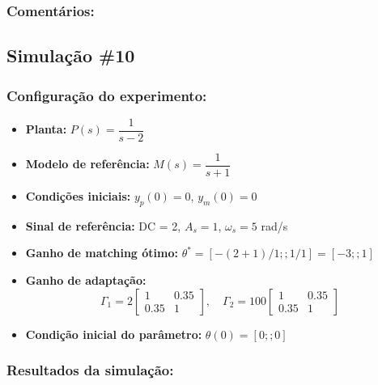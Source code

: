 \documentclass[10pt]{article}
\begin{document}
\subsubsection{Comentários:}

\newpage

\subsection{Simulação \#10}
\subsubsection{Configuração do experimento:}
\begin{itemize}
\item \textbf{Planta:} $P(s) = \dfrac{1}{s - 2}$
\item \textbf{Modelo de referência:} $M(s) = \dfrac{1}{s + 1}$
\item \textbf{Condições iniciais:} $y_p(0)=0$, $y_m(0)=0$
\item \textbf{Sinal de referência:} DC = 2, $A_s=1$, $\omega_s=5$ rad/s
\item \textbf{Ganho de matching ótimo:} $\theta^* = [-(2+1)/1;;1/1] = [-3;;1]$
\item \textbf{Ganho de adaptação:} 
\[
\Gamma_1 = 2 \begin{bmatrix} 1 & 0.35 \\ 0.35 & 1 \end{bmatrix}, \quad
\Gamma_2 = 100 \begin{bmatrix} 1 & 0.35 \\ 0.35 & 1 \end{bmatrix}
\]
\item \textbf{Condição inicial do parâmetro:} $\theta(0) = [0;;0]$
\end{itemize}

\subsubsection{Resultados da simulação:}
\end{document}
